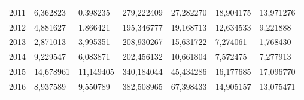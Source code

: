 \begin{table}
\begin{tabular}{p{1cm}p{2cm}p{2cm}p{2cm}p{2cm}p{2cm}p{2cm}}
 2011 &     6,362823 &          0,398235 & 279,222409 &                           27,282270 &                      18,904175 &                           13,971276 \\
 2012 &     4,881627 &          1,866421 & 195,346777 &                           19,168713 &                      12,634533 &                            9,221888 \\
 2013 &     2,871013 &          3,995351 & 208,930267 &                           15,631722 &                       7,274061 &                            1,768430 \\
 2014 &     9,229547 &          6,083871 & 202,456132 &                           10,661804 &                       7,572475 &                            7,277913 \\
 2015 &    14,678961 &         11,149405 & 340,184044 &                           45,434286 &                      16,177685 &                           17,096770 \\
 2016 &     8,937589 &          9,550789 & 382,508965 &                           67,398433 &                      14,905157 &                           13,075471 \\
\bottomrule
\end{tabular}
\end{table}
